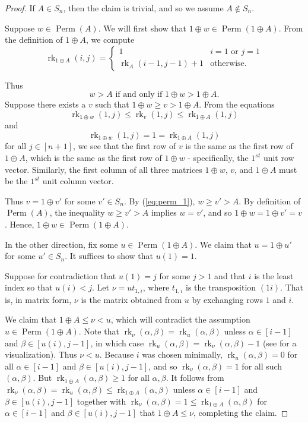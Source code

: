 \documentclass[10pt,a4paper]{amsart}
\DeclareMathOperator{\Perm}{Perm}
\DeclareMathOperator{\rk}{rk}
\begin{document}
\begin{proof}
If $A \in S_n$, then the claim is trivial, and so we assume $A \notin S_n$.

Suppose $w \in \Perm(A)$.  We will first show that $1 \oplus w \in \Perm(1 \oplus A)$.  From the definition of $1 \oplus A$, we compute \[\rk_{1 \oplus A}(i,j) = 
\begin{cases}
1 & i=1 \mbox{ or } j=1\\
\rk_A(i-1,j-1)+1 & \mbox{otherwise}.
\end{cases}
\]

Thus
\begin{equation}\label{eq:perm_1}
    \text{$w > A$ if and only if $1 \oplus w > {1 \oplus A}$.}
\end{equation}
Suppose there exists a $v$ such that $1 \oplus w \ge v > 1 \oplus A$.  From the equations
\[
    \rk_{1 \oplus w}(1,j) \le \rk_{v}(1,j) \le \rk_{1 \oplus A}(1,j)
\] and \[
 \rk_{1 \oplus w}(1,j) = 1 = \rk_{1 \oplus A}(1,j)
\]
for all $j \in [n+1]$, we see that the first row of $v$ is the same as the first row of $1 \oplus A$, which is the same as the first row of $1 \oplus w$ - specifically, the $1^{st}$ unit row vector.  Similarly, the first column of all three matrices $1 \oplus w$, $v$, and $1 \oplus A$ must be the $1^{st}$ unit column vector.  

Thus $v = 1 \oplus v'$ for some $v' \in S_n$.  By (\ref{eq:perm_1}), $w \geq v'>A$.  By definition of $\Perm(A)$, the inequality $w \geq v' > A$ implies $w=v'$, and so $1 \oplus w = 1 \oplus v'=v$.  Hence, $1 \oplus w \in \Perm(1 \oplus A)$.

In the other direction, fix some $u \in \Perm(1 \oplus A)$.  We claim that $u = 1 \oplus u'$ for some $u' \in S_n$.  It suffices to show that $u(1) = 1$.

Suppose for contradiction that $u(1) = j$ for some $j>1$ and that $i$ is the least index so that $u(i)<j$.  Let $\nu = ut_{1,i}$, where $t_{1,i}$ is the transposition $(1i)$.  That is, in matrix form, $\nu$ is the matrix obtained from $u$ by exchanging rows $1$ and $i$. 

We claim that $1 \oplus A \leq \nu <u$, which will contradict the assumption $u \in \Perm(1 \oplus A)$.  Note that $\rk_\nu(\alpha,\beta) = \rk_u(\alpha,\beta)$ unless $\alpha \in [i-1]$ and $\beta \in [u(i), j-1]$, in which case $\rk_u(\alpha,\beta) = \rk_\nu(\alpha,\beta)-1$ (see  for a visualization). Thus $\nu<u$.  Because $i$ was chosen minimally, $\rk_u(\alpha,\beta) = 0$ for all $\alpha \in [i-1]$ and $\beta \in [u(i), j-1]$, and so $\rk_\nu(\alpha,\beta) = 1$ for all such $(\alpha, \beta)$.  But $\rk_{1 \oplus A}(\alpha, \beta) \ge 1$ for all $\alpha,\beta$.  It follows from $\rk_\nu(\alpha,\beta) = \rk_u(\alpha,\beta) \leq \rk_{1 \oplus A}(\alpha, \beta)$ unless $\alpha \in [i-1]$ and $\beta \in [u(i), j-1]$ together with $\rk_\nu(\alpha,\beta) = 1 \leq \rk_{1 \oplus A}(\alpha,\beta)$ for $\alpha \in [i-1]$ and $\beta \in [u(i), j-1]$ that $1 \oplus A \leq \nu$, completing the claim.


\end{proof}
\end{document}
